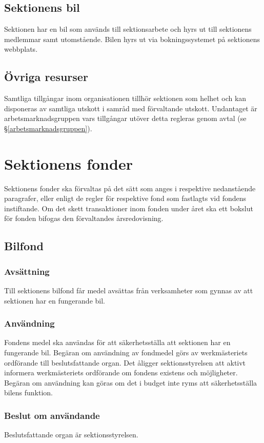 \documentclass{datateknologsektionen-document}
\begin{document}
\subsection{Sektionens bil}
Sektionen har en bil som används till sektionsarbete och hyrs ut till sektionens medlemmar samt
utomstående. Bilen hyrs ut via bokningssystemet på sektionens webbplats.

\subsection{Övriga resurser}
Samtliga tillgångar inom organisationen tillhör sektionen som helhet och kan disponeras
av samtliga utskott i samråd med förvaltande utskott. Undantaget är arbetsmarknadsgruppen
vars tillgångar utöver detta regleras genom avtal (se \S \ref{arbetsmarknadsgruppen}).

\section{Sektionens fonder}
\label{fonder}
Sektionens fonder ska förvaltas på det sätt som anges i respektive nedanstående paragrafer, eller
enligt de regler för respektive fond som fastlagts vid fondens instiftande. Om det skett
transaktioner inom fonden under året ska ett bokslut för fonden bifogas den förvaltandes
årsredovisning.

\subsection{Bilfond}
\subsubsection{Avsättning}
Till sektionens bilfond får medel avsättas från verksamheter som gynnas av att sektionen har en
fungerande bil.

\subsubsection{Användning}
Fondens medel ska användas för att säkerhetsställa att sektionen har en fungerande bil.
Begäran om användning av fondmedel görs av werkmästeriets ordförande till beslutsfattande
organ. Det åligger sektionsstyrelsen att aktivt informera werkmästeriets ordförande om
fondens existens och möjligheter. Begäran om användning kan göras om det i budget inte
ryms att säkerhetsställa bilens funktion.

\subsubsection{Beslut om användande}
Beslutsfattande organ är sektionsstyrelsen.
\end{document}
